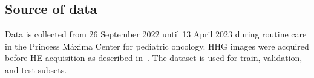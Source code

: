 \subsection{Source of data}

Data is collected from 26 September 2022 until 13 April 2023 during routine care in the Princess Máxima Center for pediatric oncology.
HHG images were acquired before HE-acquisition as described in~\cite{Spies2023}.
The dataset is used for train, validation, and test subsets.

